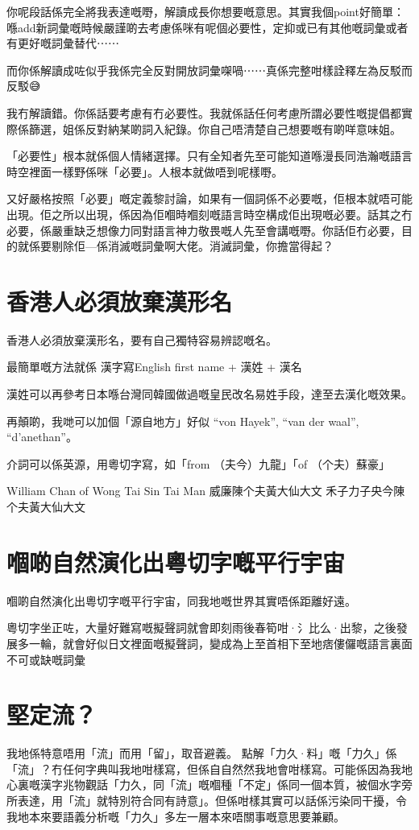 \documentclass[a5paper, 10pt, openany]{book} %
\begin{document}
你呢段話係完全將我表達嘅嘢，解讀成長你想要嘅意思。其實我個point好簡單：喺add新詞彙嘅時候嚴謹啲去考慮係咪有呢個必要性，定抑或已有其他嘅詞彙或者有更好嘅詞彙替代⋯⋯

而你係解讀成咗似乎我係完全反對開放詞彙㗎喎⋯⋯真係完整咁樣詮釋左為反駁而反駁😅


我冇解讀錯。你係話要考慮有冇必要性。我就係話任何考慮所謂必要性嘅提倡都實際係篩選，姐係反對納某啲詞入紀錄。你自己唔清楚自己想要嘅有啲咩意味姐。

「必要性」根本就係個人情緒選擇。只有全知者先至可能知道喺漫長同浩瀚嘅語言時空裡面一樣野係咪「必要」。人根本就做唔到呢樣嘢。

又好嚴格按照「必要」嘅定義黎討論，如果有一個詞係不必要嘅，佢根本就唔可能出現。佢之所以出現，係因為佢嗰時嗰刻嘅語言時空構成佢出現嘅必要。話其之冇必要，係嚴重缺乏想像力同對語言神力敬畏嘅人先至會講嘅嘢。你話佢冇必要，目的就係要剔除佢—係消滅嘅詞彙啊大佬。消滅詞彙，你擔當得起？

\chapter{香港人必須放棄漢形名}
香港人必須放棄漢形名，要有自己獨特容易辨認嘅名。

最簡單嘅方法就係 漢字寫English first name + 漢姓 + 漢名

漢姓可以再參考日本喺台灣同韓國做過嘅皇民改名易姓手段，達至去漢化嘅效果。

再顛啲，我哋可以加個「源自地方」好似 “von Hayek”, “van der waal”, “d’anethan”。

介詞可以係英源，用粵切字寫，如「from （夫今）九龍」「of （个夫）蘇豪」

William Chan of Wong Tai Sin Tai Man
威廉陳个夫黃大仙大文
禾子力子央今陳个夫黃大仙大文

\chapter{嗰啲自然演化出粵切字嘅平行宇宙}
嗰啲自然演化出粵切字嘅平行宇宙，同我地嘅世界其實唔係距離好遠。

粵切字坐正咗，大量好難寫嘅擬聲詞就會即刻雨後春筍咁·氵比么·出黎，之後發展多一輪，就會好似日文裡面嘅擬聲詞，變成為上至首相下至地痞僂儸嘅語言裏面不可或缺嘅詞彙


\chapter{堅定流？}
我地係特意唔用「流」而用「留」，取音避義。
點解「力久·料」嘅「力久」係「流」？冇任何字典叫我地咁樣寫，但係自自然然我地會咁樣寫。可能係因為我地心裏嘅漢字兆物觀話「力久，同「流」嘅嗰種「不定」係同一個本質，被個水字旁所表達，用「流」就特別符合同有詩意」。但係咁樣其實可以話係污染同干擾，令我地本來要語義分析嘅「力久」多左一層本來唔關事嘅意思要兼顧。
\end{document}
